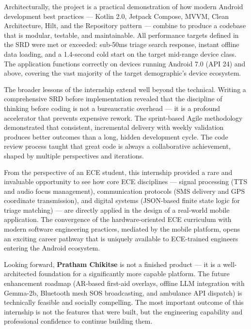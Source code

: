 \documentclass[12pt,a4paper]{report}
\begin{document}
\vspace{0.4cm}

Architecturally, the project is a practical demonstration of how modern Android development best practices — Kotlin 2.0, Jetpack Compose, MVVM, Clean Architecture, Hilt, and the Repository pattern — combine to produce a codebase that is modular, testable, and maintainable. All performance targets defined in the SRD were met or exceeded: sub-50ms triage search response, instant offline data loading, and a 1.4-second cold start on the target mid-range device class. The application functions correctly on devices running Android 7.0 (API 24) and above, covering the vast majority of the target demographic's device ecosystem.

\vspace{0.4cm}

The broader lessons of the internship extend well beyond the technical. Writing a comprehensive SRD before implementation revealed that the discipline of thinking before coding is not a bureaucratic overhead — it is a profound accelerator that prevents expensive rework. The sprint-based Agile methodology demonstrated that consistent, incremental delivery with weekly validation produces better outcomes than a long, hidden development cycle. The code review process taught that great code is always a collaborative achievement, shaped by multiple perspectives and iterations.

\vspace{0.4cm}

From the perspective of an ECE student, this internship provided a rare and invaluable opportunity to see how core ECE disciplines — signal processing (TTS and audio focus management), communication protocols (SMS delivery and GPS coordinate transmission), and digital systems (JSON-based finite state logic for triage matching) — are directly applied in the design of a real-world mobile application. The convergence of the hardware-oriented ECE curriculum with modern software engineering practices, mediated by the mobile platform, opens an exciting career pathway that is uniquely available to ECE-trained engineers entering the Android ecosystem.

\vspace{0.4cm}

Looking forward, \textbf{Pratham Chikitse} is not a finished product — it is a well-architected foundation for a significantly more capable platform. The future enhancement roadmap (AR-based first-aid overlays, offline LLM integration with Gemma-2b, Bluetooth mesh SOS broadcasting, and ambulance API dispatch) is technically feasible and socially compelling. The most important outcome of this internship is not the features that were built, but the engineering capability and professional confidence to continue building them.
\end{document}
